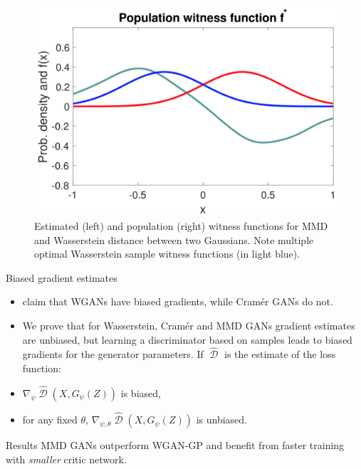 \documentclass[xcolor={table}]{beamer}
\DeclareMathOperator{\D}{\mathcal{D}}
\begin{document}
\begin{frame}{}
\begin{columns}[T, totalwidth=\textwidth]
  \begin{column}{.32\textwidth}
    \begin{figure}
      \centering
        \includegraphics[with=1.1\columnwidth]{figs/witness.png}
      \caption{Estimated (left) and population (right) witness functions for MMD and Wasserstein distance between two Gaussians. Note multiple optimal Wasserstein sample witness functions (in light blue).}
    \end{figure}
    \vspace*{-1.3cm}
    \begin{block}{Biased gradient estimates}
      \begin{itemize}
        \item \citet{cramer-gan} claim that WGANs have biased gradients, while Cram\'er GANs do not.
        \item We prove that for Wasserstein, Cram\'er and MMD GANs gradient estimates
              are unbiased, but learning a discriminator based on samples leads to biased gradients 
              for the generator parameters. If $\widehat{\D}$ is the estimate of the loss function: 
        \item $\nabla_{\psi}\widehat{\D}(X, G_{\psi}(Z))$ is biased,
        \item for any fixed $\theta$, $\nabla_{\psi, \theta} \widehat{\D}(X, G_{\psi}(Z))$ is unbiased.
      \end{itemize}
    \end{block}
    \vspace*{-1.3cm}
    \begin{block}{Results}
      MMD GANs outperform WGAN-GP and benefit from faster training with \emph{smaller} critic network.

\end{block}
\end{column}
\end{columns}
\end{frame}
\end{document}
